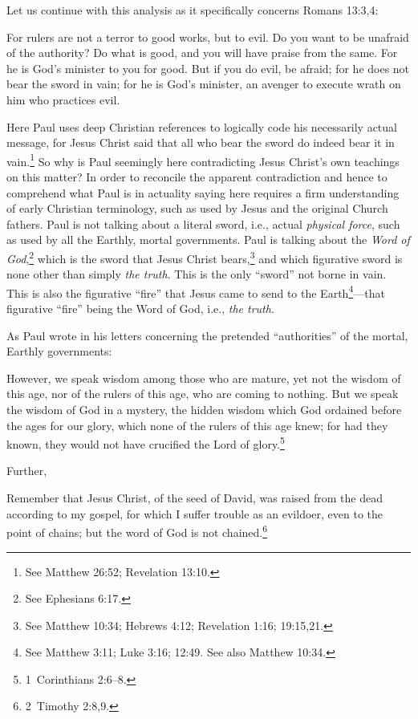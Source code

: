 \documentclass[letterpaper,12pt]{article}
\newenvironment{squote}
  {\small\quote}
  {\endquote\normalsize}
\begin{document}
Let us continue with this analysis as it specifically concerns Romans 13:3,4:

\begin{squote}
For rulers are not a terror to good works, but to evil. Do you want to be unafraid of the authority? Do what is good, and you will have praise from the same. For he is God's minister to you for good. But if you do evil, be afraid; for he does not bear the sword in vain; for he is God's minister, an avenger to execute wrath on him who practices evil.
\end{squote}

Here Paul uses deep Christian references to logically code his necessarily actual message, for Jesus Christ said that all who bear the sword do indeed bear it in vain.\footnote{See Matthew 26:52; Revelation 13:10.} So why is Paul seemingly here contradicting Jesus Christ's own teachings on this matter? In order to reconcile the apparent contradiction and hence to comprehend what Paul is in actuality saying here requires a firm understanding of early Christian terminology, such as used by Jesus and the original Church fathers. Paul is not talking about a literal sword, i.e., actual \emph{physical force}, such as used by all the Earthly, mortal governments. Paul is talking about the \emph{Word of God},\footnote{See Ephesians 6:17.} which is the sword that Jesus Christ bears,\footnote{See Matthew 10:34; Hebrews 4:12; Revelation 1:16; 19:15,21.} and which figurative sword is none other than simply \emph{the truth}. This is the only ``sword'' not borne in vain. This is also the figurative ``fire'' that Jesus came to send to the Earth\footnote{See Matthew 3:11; Luke 3:16; 12:49. See also Matthew 10:34.}---that figurative ``fire'' being the Word of God, i.e., \emph{the truth}.

As Paul wrote in his letters concerning the pretended ``authorities'' of the mortal, Earthly governments:

\begin{squote}
However, we speak wisdom among those who are mature, yet not the wisdom of this age, nor of the rulers of this age, who are coming to nothing. But we speak the wisdom of God in a mystery, the hidden wisdom which God ordained before the ages for our glory, which none of the rulers of this age knew; for had they known, they would not have crucified the Lord of glory.\footnote{1~Corinthians 2:6--8.}
\end{squote}

Further,

\begin{squote}
Remember that Jesus Christ, of the seed of David, was raised from the dead according to my gospel, for which I suffer trouble as an evildoer, even to the point of chains; but the word of God is not chained.\footnote{2~Timothy 2:8,9.}
\end{squote}
\end{document}
